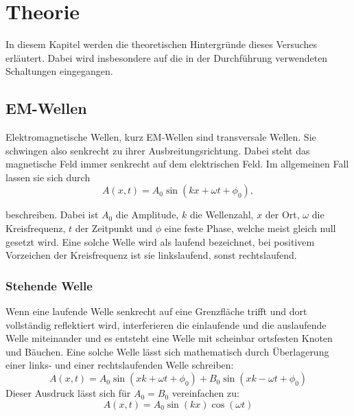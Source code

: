 \section{Theorie} 
\label{sec:Theorie}

In diesem Kapitel werden die theoretischen Hintergründe dieses Versuches erläutert. Dabei wird insbesondere auf die in der Durchführung verwendeten Schaltungen eingegangen.


\subsection{EM-Wellen}
\label{sec:themwellen}
Elektromagnetische Wellen, kurz EM-Wellen sind transversale Wellen. Sie schwingen also senkrecht zu ihrer
Ausbreitungsrichtung. Dabei steht das magnetische Feld immer senkrecht auf dem elektrischen Feld.
Im allgemeinen Fall lassen sie sich durch  
\begin{equation}
    \label{eq:wellenfunktion}
    A(x,t)=A_0\sin(kx+\omega t+\phi_0),
\end{equation}

beschreiben. Dabei ist $A_0$ die Amplitude, $k$ die Wellenzahl, $x$ der Ort, $\omega$ die Kreisfrequenz, $t$ der Zeitpunkt
und $\phi$ eine feste Phase, welche meist gleich null gesetzt wird. Eine solche Welle wird als laufend bezeichnet, bei positivem Vorzeichen der Kreisfrequenz
ist sie linkslaufend, sonst rechtslaufend.


\subsubsection{Stehende Welle}
\label{sec:thstehendewelle}
Wenn eine laufende Welle senkrecht auf eine Grenzfläche trifft und dort vollständig reflektiert wird,
interferieren die einlaufende und die auslaufende Welle miteinander und es entsteht eine Welle
mit scheinbar ortsfesten Knoten und Bäuchen. Eine solche Welle lässt sich mathematisch durch Überlagerung
einer links- und einer rechtslaufenden Welle schreiben:
\begin{equation}
    \label{eq:stehendewelle}
    A(x,t)=A_0\sin(xk+\omega t +\phi_0)+B_0\sin(xk-\omega t +\phi_0)
\end{equation}
Dieser Ausdruck lässt sich für $A_0=B_0$ vereinfachen zu:
\begin{equation}
    A(x,t)=A_0\sin(kx)\cos(\omega t)
\end{equation}

